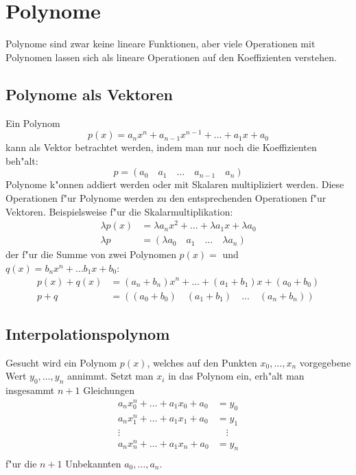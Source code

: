\chapter{Polynome\label{chapter-polynome}}
Polynome sind zwar keine lineare Funktionen, aber viele 
Operationen mit Polynomen lassen sich als lineare Operationen
auf den Koeffizienten verstehen.

\section{Polynome als Vektoren}
Ein Polynom 
$$p(x)=a_nx^n+a_{n-1}x^{n-1}+\dots+a_1x +a_0$$
kann als Vektor betrachtet werden, indem man nur noch die Koeffizienten
beh"alt:
$$p=(
a_0\quad a_1\quad \dots\quad a_{n-1}\quad a_n
)
$$
Polynome k"onnen addiert werden oder mit Skalaren multipliziert
werden.
Diese Operationen f"ur Polynome werden zu den entsprechenden Operationen
f"ur Vektoren.
Beispielsweise f"ur die Skalarmultiplikation:
\begin{align*}
\lambda p(x)&=\lambda a_nx^2+\dots +\lambda a_1x+\lambda a_0
\\
\lambda p&=(\lambda a_0\quad a_1\quad \dots\quad \lambda a_n)
\end{align*}
der f"ur die Summe von zwei Polynomen
$p(x)=$ und $q(x)=b_nx^n+\dots b_1x+b_0$:
\begin{align*}
p(x)+q(x)&=(a_n+b_n)x^n+\dots+(a_1+b_1)x+(a_0+b_0)\\
p+q&=((a_0+b_0)\quad(a_1+b_1)\quad\dots\quad (a_n+b_n))
\end{align*}

\section{Interpolationspolynom}
Gesucht wird ein Polynom $p(x)$, welches auf den Punkten $x_0,\dots,x_n$
vorgegebene Wert $y_0,\dots,y_n$ annimmt.
Setzt man $x_i$ in das Polynom
ein, erh"alt man insgesammt $n+1$ Gleichungen
\begin{align*}
a_nx_0^n+\dots+a_1x_0+a_0&=y_0\\
a_nx_1^n+\dots+a_1x_1+a_0&=y_1\\
\vdots&\quad\vdots\\
a_nx_n^n+\dots+a_1x_n+a_0&=y_n\\
\end{align*}
f"ur die $n+1$ Unbekannten $a_0,\dots,a_n$.




